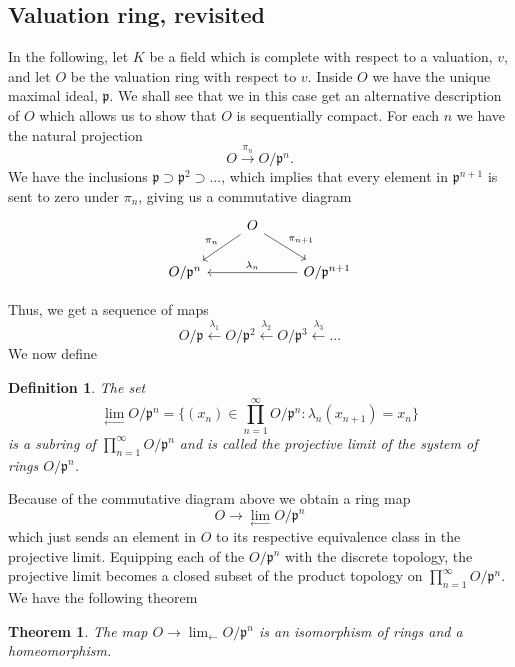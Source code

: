 \documentclass{article}
\newtheorem{theorem}{Theorem}[section]
\newtheorem{definition}{Definition}[section]
\newcommand{\mfrak}[1]{\mathfrak{#1}}
\numberwithin{equation}{section}
\begin{document}
\subsection{Valuation ring, revisited}

In the following, let $K$ be a field which is complete with respect to a valuation, $v$, and let $O$ be the valuation ring with respect to $v$. Inside $O$ we have the unique maximal ideal, $\mfrak p$. We shall see that we in this case get an alternative description of $O$ which allows us to show that $O$ is sequentially compact. For each $n$ we have the natural projection
$$O \xrightarrow{\pi_n} O / \mfrak p^n.$$
We have the inclusions $\mfrak p \supset \mfrak p^2 \supset ...$, which implies that every element in $\mfrak p^{n+1}$ is sent to zero under $\pi_n$, giving us a commutative diagram
$$\begin{tikzcd}
        & O \arrow[ld, "\pi_{n}"'] \arrow[rd, "\pi_{n+1}"] & \\
        O / \mfrak p^{n} & & O / \mfrak p^{n+1} \arrow[ll, "\lambda_{n}"']
    \end{tikzcd}$$

Thus, we get a sequence of maps
$$O / \mfrak p \xleftarrow {\lambda_1} O / \mfrak p^2 \xleftarrow {\lambda_2} O / \mfrak p^3 \xleftarrow {\lambda_3} ...$$
We now define
\begin{definition}
    The set
    $$\lim_{\leftarrow} O / \mfrak p^n = \{ (x_n) \in \prod_{n=1}^\infty O / \mfrak p^n : \lambda_n(x_{n+1}) = x_n \}$$
    is a subring of $\prod_{n=1}^\infty O / \mfrak p^n$ and is called the projective limit of the system of rings $O / \mfrak p^n$.
\end{definition}

Because of the commutative diagram above we obtain a ring map
$$O \to \lim_{\leftarrow} O / \mfrak p^n$$
which just sends an element in $O$ to its respective equivalence class in the projective limit. Equipping each of the $O / \mfrak p^n$ with the discrete topology, the projective limit becomes a closed subset of the product topology on $\prod_{n=1}^\infty O / \mfrak p^n$. We have the following theorem

\begin{theorem}
    The map $O \to \lim_{\leftarrow} O / \mfrak p^n$ is an isomorphism of rings and a homeomorphism.
\end{theorem}

    
\end{document}
